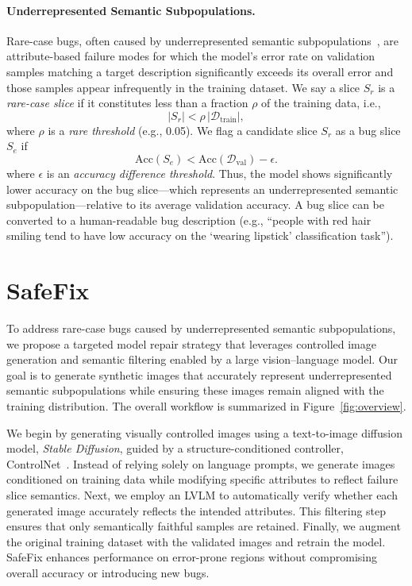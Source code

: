 \documentclass[10pt]{article} %
\newcommand{\model}{SafeFix\xspace}
\newcommand{\controlnet}{ControlNet\xspace}
\begin{document}
\paragraph{Underrepresented Semantic Subpopulations.} Rare-case bugs, often caused by underrepresented semantic subpopulations~\citep{eyuboglu2022rare}, are attribute-based failure modes for which the model’s error rate on validation samples matching a target description significantly exceeds its overall error and those samples appear infrequently in the training dataset. We say a slice \(S_r\) is a \emph{rare-case slice} if it constitutes less than a fraction \(\rho\) of the training data, i.e., 
\begin{equation}
|S_r| < \rho \,\bigl|\mathcal{D}_{\mathrm{train}}\bigr|,
\label{eq:rare}
\end{equation}
where \(\rho\) is a \emph{rare threshold} (e.g., 0.05). We flag a candidate slice \(S_r\) as a bug slice \(S_e\) if  
\begin{equation}
\mathrm{Acc}(S_{e}) < \mathrm{Acc}(\mathcal{D}_{\mathrm{val}}) - \epsilon.
\label{eq:low_acc_and_rare}
\end{equation}
where \(\epsilon\) is an \emph{accuracy difference threshold}. Thus, the model shows significantly lower accuracy on the bug slice—which represents an underrepresented semantic subpopulation—relative to its average validation accuracy. A bug slice can be converted to a human-readable bug description (e.g., “people with red hair smiling tend to have low accuracy on the ‘wearing lipstick’ classification task”).





\section{\model}
To address rare-case bugs caused by underrepresented semantic subpopulations, we propose a targeted model repair strategy that leverages controlled image generation and semantic filtering enabled by a large vision--language model. Our goal is to generate synthetic images that accurately represent underrepresented semantic subpopulations while ensuring these images remain aligned with the training distribution. The overall workflow is summarized in Figure~\ref{fig:overview}.

We begin by generating visually controlled images using a text-to-image diffusion model, \textit{Stable Diffusion}, guided by a structure-conditioned controller, \controlnet{}~\citep{zhang2023adding}. Instead of relying solely on language prompts, we generate images conditioned on training data while modifying specific attributes to reflect failure slice semantics. Next, we employ an LVLM to automatically verify whether each generated image accurately reflects the intended attributes. This filtering step ensures that only semantically faithful samples are retained. Finally, we augment the original training dataset with the validated images and retrain the model. \model{} enhances performance on error-prone regions without compromising overall accuracy or introducing new bugs.
\end{document}
